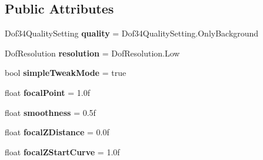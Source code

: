 \subsection*{Public Attributes}
\begin{DoxyCompactItemize}
\item 
Dof34\+Quality\+Setting {\bfseries quality} = Dof34\+Quality\+Setting.\+Only\+Background\hypertarget{class_unity_standard_assets_1_1_image_effects_1_1_depth_of_field_deprecated_aaf4842adbf0fdf668b60af2de6f5c795}{}\label{class_unity_standard_assets_1_1_image_effects_1_1_depth_of_field_deprecated_aaf4842adbf0fdf668b60af2de6f5c795}

\item 
Dof\+Resolution {\bfseries resolution} = Dof\+Resolution.\+Low\hypertarget{class_unity_standard_assets_1_1_image_effects_1_1_depth_of_field_deprecated_a9651a60202f4d3c34ee840334293c923}{}\label{class_unity_standard_assets_1_1_image_effects_1_1_depth_of_field_deprecated_a9651a60202f4d3c34ee840334293c923}

\item 
bool {\bfseries simple\+Tweak\+Mode} = true\hypertarget{class_unity_standard_assets_1_1_image_effects_1_1_depth_of_field_deprecated_a2949e8a9c6b625685ce6794378c420c2}{}\label{class_unity_standard_assets_1_1_image_effects_1_1_depth_of_field_deprecated_a2949e8a9c6b625685ce6794378c420c2}

\item 
float {\bfseries focal\+Point} = 1.\+0f\hypertarget{class_unity_standard_assets_1_1_image_effects_1_1_depth_of_field_deprecated_a84e2df980b6aa674c26f98491cc99517}{}\label{class_unity_standard_assets_1_1_image_effects_1_1_depth_of_field_deprecated_a84e2df980b6aa674c26f98491cc99517}

\item 
float {\bfseries smoothness} = 0.\+5f\hypertarget{class_unity_standard_assets_1_1_image_effects_1_1_depth_of_field_deprecated_a9fdc06de652648e0ccfba3b74eb24e33}{}\label{class_unity_standard_assets_1_1_image_effects_1_1_depth_of_field_deprecated_a9fdc06de652648e0ccfba3b74eb24e33}

\item 
float {\bfseries focal\+Z\+Distance} = 0.\+0f\hypertarget{class_unity_standard_assets_1_1_image_effects_1_1_depth_of_field_deprecated_ad80b6eda7b9940f54416509b8a566e74}{}\label{class_unity_standard_assets_1_1_image_effects_1_1_depth_of_field_deprecated_ad80b6eda7b9940f54416509b8a566e74}

\item 
float {\bfseries focal\+Z\+Start\+Curve} = 1.\+0f\hypertarget{class_unity_standard_assets_1_1_image_effects_1_1_depth_of_field_deprecated_a7124112016ac9731c8e52b01e0c8ff7d}{}\label{class_unity_standard_assets_1_1_image_effects_1_1_depth_of_field_deprecated_a7124112016ac9731c8e52b01e0c8ff7d}


\end{DoxyCompactItemize}
